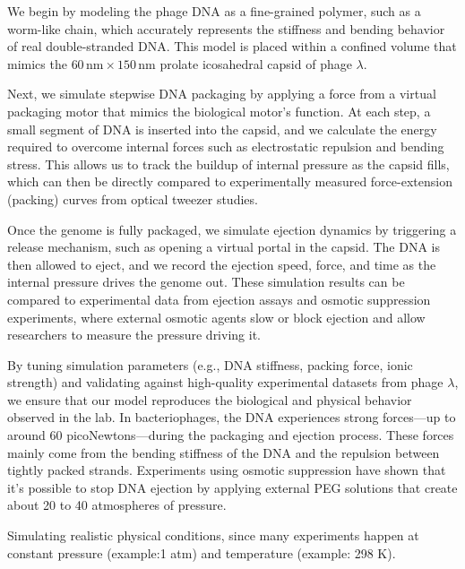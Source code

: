 \documentclass[12pt]{article}
\begin{document}
\begin{flushleft}
	
		





We begin by modeling the phage DNA as a fine-grained polymer, such as a worm-like chain, which accurately represents the stiffness and bending behavior of real double-stranded DNA. This model is placed within a confined volume that mimics the $60\,\text{nm} \times 150\,\text{nm}$ prolate icosahedral capsid of phage $\lambda$.
 


Next, we simulate stepwise DNA packaging by applying a force from a virtual packaging motor that mimics the biological motor’s function. At each step, a small segment of DNA is inserted into the capsid, and we calculate the energy required to overcome internal forces such as electrostatic repulsion and bending stress. This allows us to track the buildup of internal pressure as the capsid fills, which can then be directly compared to experimentally measured force-extension (packing) curves from optical tweezer studies.

Once the genome is fully packaged, we simulate ejection dynamics by triggering a release mechanism, such as opening a virtual portal in the capsid. The DNA is then allowed to eject, and we record the ejection speed, force, and time as the internal pressure drives the genome out. These simulation results can be compared to experimental data from ejection assays and osmotic suppression experiments, where external osmotic agents slow or block ejection and allow researchers to measure the pressure driving it.


By tuning simulation parameters (e.g., DNA stiffness, packing force, ionic strength) and validating against high-quality experimental datasets from phage $\lambda$, we ensure that our model reproduces the biological and physical behavior observed in the lab. In bacteriophages, the DNA experiences strong forces—up to around 60 picoNewtons—during the packaging and ejection process. These forces mainly come from the bending stiffness of the DNA and the repulsion between tightly packed strands. Experiments using osmotic suppression have shown that it's possible to stop DNA ejection by applying external PEG solutions that create about 20 to 40 atmospheres of pressure\cite{Grayson2006}.







Simulating realistic physical conditions, since many experiments happen at constant pressure (example:1 atm) and temperature  (example: 298 K).


\end{flushleft}
\end{document}

